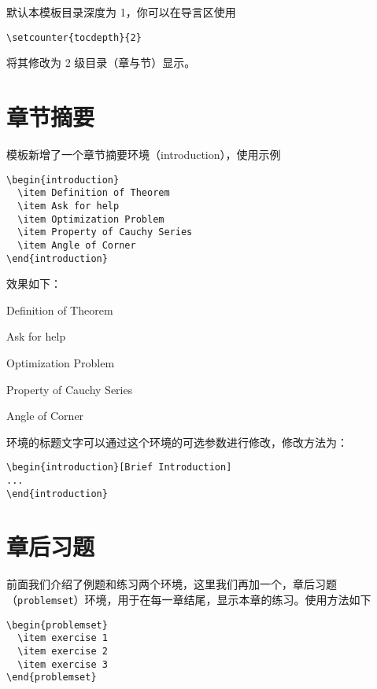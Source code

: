 默认本模板目录深度为 1，你可以在导言区使用
\begin{lstlisting}
\setcounter{tocdepth}{2}
\end{lstlisting}
将其修改为 2 级目录（章与节）显示。


\section{章节摘要}
模板新增了一个章节摘要环境（introduction），使用示例
\begin{lstlisting}
\begin{introduction}
  \item Definition of Theorem
  \item Ask for help
  \item Optimization Problem
  \item Property of Cauchy Series
  \item Angle of Corner
\end{introduction}
\end{lstlisting}
效果如下：
\begin{introduction}
  \item Definition of Theorem
  \item Ask for help
  \item Optimization Problem
  \item Property of Cauchy Series
  \item Angle of Corner
\end{introduction}

环境的标题文字可以通过这个环境的可选参数进行修改，修改方法为：
\begin{lstlisting}
\begin{introduction}[Brief Introduction]
...
\end{introduction}
\end{lstlisting}

\section{章后习题}
前面我们介绍了例题和练习两个环境，这里我们再加一个，章后习题（\lstinline{problemset}）环境，用于在每一章结尾，显示本章的练习。使用方法如下

\begin{lstlisting}
\begin{problemset}
  \item exercise 1
  \item exercise 2
  \item exercise 3
\end{problemset}
\end{lstlisting}



